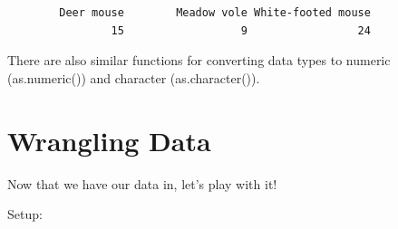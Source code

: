 \documentclass[
  letterpaper,
  DIV=11,
  numbers=noendperiod]{scrreprt}
\newenvironment{Shaded}{\begin{snugshade}}{\end{snugshade}}
\newcommand{\DocumentationTok}[1]{\textcolor[rgb]{0.37,0.37,0.37}{\textit{#1}}}
\newcommand{\FunctionTok}[1]{\textcolor[rgb]{0.28,0.35,0.67}{#1}}
\newcommand{\NormalTok}[1]{\textcolor[rgb]{0.00,0.23,0.31}{#1}}
\newcommand{\OtherTok}[1]{\textcolor[rgb]{0.00,0.23,0.31}{#1}}
\newcommand{\SpecialCharTok}[1]{\textcolor[rgb]{0.37,0.37,0.37}{#1}}
\begin{document}
\begin{verbatim}
        Deer mouse        Meadow vole White-footed mouse 
                15                  9                 24 
\end{verbatim}

\begin{Shaded}
\end{Shaded}

There are also similar functions for converting data types to numeric
(as.numeric()) and character (as.character()).

\hypertarget{wrangling-data}{%
\chapter{Wrangling Data}\label{wrangling-data}}

Now that we have our data in, let's play with it!

Setup:
\end{document}
